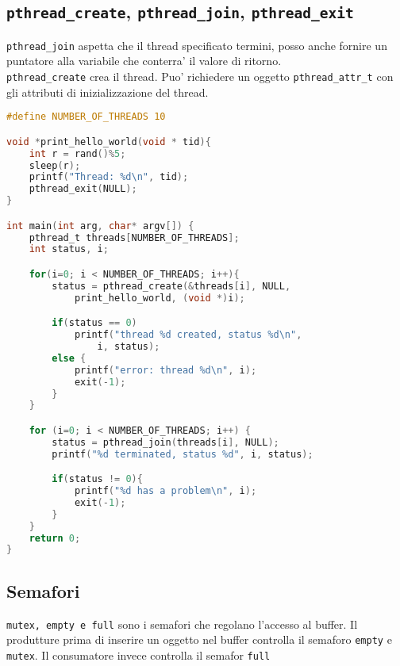 \subsection{\texttt{pthread\_create}, \texttt{pthread\_join}, \texttt{pthread\_exit}}

\texttt{pthread\_join} aspetta che il thread specificato termini, posso anche
fornire un puntatore alla variabile che conterra' il valore di ritorno. \\

\texttt{pthread\_create} crea il thread. Puo' richiedere un oggetto \texttt{pthread\_attr\_t}
con gli attributi di inizializzazione del thread. 

\begin{lstlisting}[language=C]
#define NUMBER_OF_THREADS 10

void *print_hello_world(void * tid){
    int r = rand()%5;
    sleep(r);
    printf("Thread: %d\n", tid);
    pthread_exit(NULL);
}

int main(int arg, char* argv[]) {
    pthread_t threads[NUMBER_OF_THREADS];
    int status, i;

    for(i=0; i < NUMBER_OF_THREADS; i++){
        status = pthread_create(&threads[i], NULL, 
            print_hello_world, (void *)i);

        if(status == 0)
            printf("thread %d created, status %d\n", 
                i, status);
        else {
            printf("error: thread %d\n", i);
            exit(-1);
        }
    }

    for (i=0; i < NUMBER_OF_THREADS; i++) {
        status = pthread_join(threads[i], NULL);
        printf("%d terminated, status %d", i, status);

        if(status != 0){
            printf("%d has a problem\n", i);
            exit(-1);
        }
    }
    return 0;
}
\end{lstlisting}

\subsection{Semafori}
\texttt{mutex, empty e full} sono i semafori che regolano l'accesso al buffer. 
Il produtture prima di inserire un oggetto nel buffer controlla il semaforo \texttt{empty} e \texttt{mutex}.
Il consumatore invece controlla il semafor \texttt{full} 

